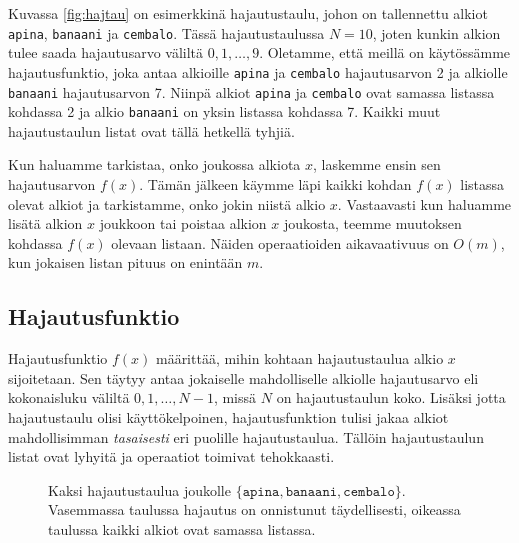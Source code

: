 Kuvassa \ref{fig:hajtau} on esimerkkinä hajautustaulu,
johon on tallennettu alkiot \texttt{apina}, \texttt{banaani} ja \texttt{cembalo}.
Tässä hajautustaulussa $N=10$, joten kunkin alkion tulee
saada hajautusarvo väliltä $0,1,\dots,9$.
Oletamme, että meillä on käytössämme hajautusfunktio,
joka antaa alkioille \texttt{apina} ja \texttt{cembalo}
hajautusarvon 2 ja alkiolle \texttt{banaani} hajautusarvon 7.
Niinpä alkiot \texttt{apina} ja \texttt{cembalo} ovat
samassa listassa kohdassa 2 ja alkio \texttt{banaani}
on yksin listassa kohdassa 7.
Kaikki muut hajautustaulun listat ovat tällä hetkellä tyhjiä.

Kun haluamme tarkistaa, onko joukossa alkiota $x$,
laskemme ensin sen hajautusarvon $f(x)$.
Tämän jälkeen käymme läpi kaikki kohdan $f(x)$
listassa olevat alkiot ja tarkistamme,
onko jokin niistä alkio $x$.
Vastaavasti kun haluamme lisätä alkion $x$ joukkoon
tai poistaa alkion $x$ joukosta,
teemme muutoksen kohdassa $f(x)$ olevaan listaan.
Näiden operaatioiden aikavaativuus on $O(m)$,
kun jokaisen listan pituus on enintään $m$.

\subsection{Hajautusfunktio}

Hajautusfunktio $f(x)$ määrittää, mihin kohtaan hajautustaulua
alkio $x$ sijoitetaan.
Sen täytyy antaa jokaiselle mahdolliselle alkiolle
hajautusarvo eli kokonaisluku väliltä $0,1,\dots,N-1$,
missä $N$ on hajautustaulun koko.
Lisäksi jotta hajautustaulu olisi käyttökelpoinen,
hajautusfunktion tulisi jakaa alkiot mahdollisimman
\emph{tasaisesti} eri puolille hajautustaulua.
Tällöin hajautustaulun listat ovat lyhyitä ja
operaatiot toimivat tehokkaasti.

\begin{figure}
\caption{Kaksi hajautustaulua joukolle $\{\texttt{apina},\texttt{banaani},\texttt{cembalo}\}$.
Vasemmassa taulussa hajautus on onnistunut täydellisesti,
oikeassa taulussa kaikki alkiot ovat samassa listassa.}
\label{fig:hajjak}
\end{figure}

